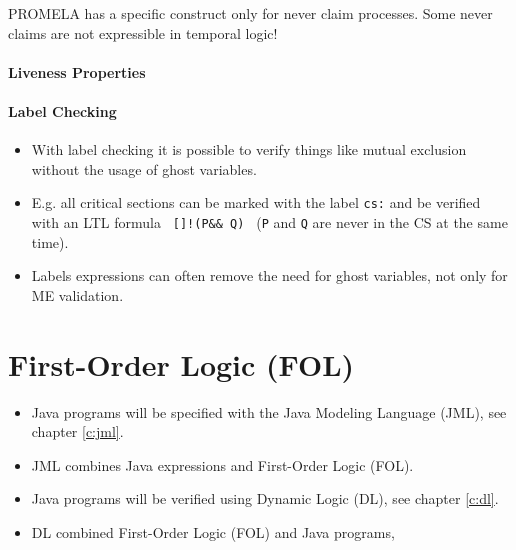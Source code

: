 					PROMELA has a specific construct only for never claim processes. Some never claims are not expressible in temporal logic!

			\subsubsection{Liveness Properties} %

			\subsubsection{Label Checking}
				\begin{itemize}
					\item With label checking it is possible to verify things like mutual exclusion without the usage of ghost variables.
					\item E.g. all critical sections can be marked with the label \texttt{cs:} and be verified with an LTL formula \texttt{ []!(P\@cs \&\& Q\@cs) } (\texttt{P} and \texttt{Q} are never in the CS at the same time).
					\item Labels expressions can often remove the need for ghost variables, not only for ME validation.
				\end{itemize}
	

\chapter{First-Order Logic (FOL)}
	\begin{itemize}
		\item Java programs will be specified with the Java Modeling Language (JML), see chapter \ref{c:jml}.
		\item JML combines Java expressions and First-Order Logic (FOL).
		\item Java programs will be verified using Dynamic Logic (DL), see chapter \ref{c:dl}.
		\item DL combined First-Order Logic (FOL) and Java programs,
	\end{itemize}

